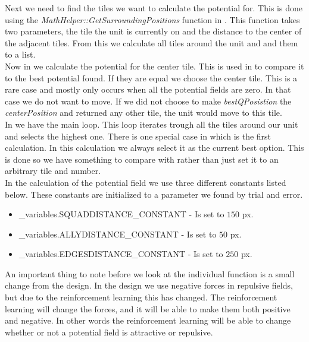     Next we need to find the tiles we want to calculate the potential for. This is done using the \textit{MathHelper::GetSurroundingPositions}  function in . This function takes two parameters, the tile the unit is currently on and the distance to the center of the adjacent tiles. From this we calculate all tiles around the unit and and them to a list. \\

    Now in  we calculate the potential for the center tile. This is used in  to compare it to the best potential found. If they are equal we choose the center tile. This is a rare case and mostly only occurs when all the potential fields are zero. In that case we do not want to move. If we did not choose to make \textit{bestQPosistion} the \textit{centerPosition} and returned any other tile, the unit would move to this tile. \\
    
    In  we have the main loop. This loop iterates trough all the tiles around our unit and selects the highest one. There is one special case in  which is the first calculation. In this calculation we always select it as the current best option. This is done so we have something to compare with rather than just set it to an arbitrary tile and number. \\
	
	    
	In the calculation of the potential field we use three different constants listed below. These constants are initialized to a parameter we found by trial and error.
	\begin{itemize}
		\item \_variables.SQUADDISTANCE\_CONSTANT - Is set to $150$ px.
		\item \_variables.ALLYDISTANCE\_CONSTANT - Is set to $50$ px.
		\item \_variables.EDGESDISTANCE\_CONSTANT - Is set to $250$ px.
	\end{itemize}
	
	An important thing to note before we look at the individual function is a small change from the design. In the design we use negative forces in repulsive fields, but due to the reinforcement learning this has changed. The reinforcement learning will change the forces, and it will be able to make them both positive and negative. In other words the reinforcement learning will be able to change whether or not a potential field is attractive or repulsive. 
		
